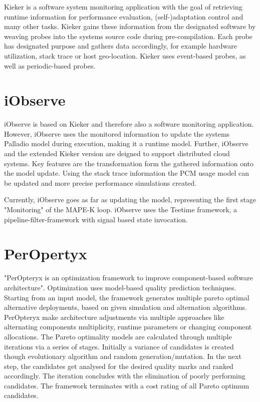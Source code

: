 Kieker is a software system monitoring application with the goal of retrieving runtime information for performance evaluation, (self-)adaptation control and many other tasks. Kieker gains these information from the designated software by weaving probes into the systems source code during pre-compilation. Each probe has designated purpose and gathers data accordingly, for example hardware utilization, stack trace or host geo-location. Kieker uses event-based probes, as well as periodic-based probes.


\section{iObserve}
\label{sec:Foundations:iobserve}

iObserve is based on Kieker and therefore also a software monitoring application. However, iObserve uses the monitored information to update the systems Palladio model during execution, making it a runtime model. Further, iObserve and the extended Kieker version are deigned to support distributed cloud systems. Key features are the transformation form the gathered information onto the model update. Using the stack trace information the PCM usage model can be updated and more precise performance simulations created. 

Currently, iObserve goes as far as updating the model, representing the first stage "Monitoring" of the MAPE-K loop. iObserve uses the Teetime framework, a pipeline-filter-framework with signal based state invocation.\cite{Heinrich.2016}

\section{PerOpertyx}
\label{sec:Foundations:peropteryx}

"PerOpteryx is an optimization framework to improve component-based software architecture". Optimization uses model-based quality prediction techniques. Starting from an input model, the framework generates multiple pareto optimal alternative deployments, based on given simulation and alternation algorithms. PerOpteryx make architecture adjustments via multiple approaches like alternating components multiplicity, runtime parameters or changing component allocations. The Pareto optimality models are calculated through multiple iterations via a series of stages. Initially a variance of candidates is created though evolutionary algorithm and random generation/mutation. In the next step, the candidates get analysed for the desired quality marks and ranked accordingly. The iteration concludes with the elimination of poorly performing candidates. The framework terminates with a cost rating of all Pareto optimum candidates.


